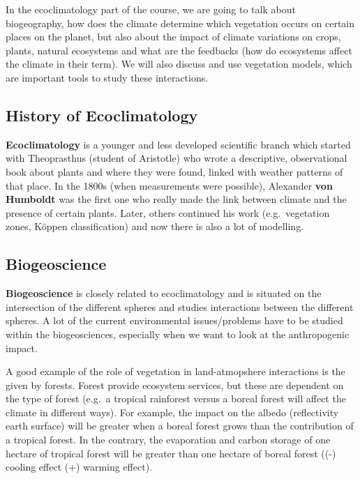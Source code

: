 \documentclass[oneside]{book}
\begin{document}
In the ecoclimatology part of the course, we are going to talk about
biogeography, how does the climate determine which vegetation occurs on
certain places on the planet, but also about the impact of climate
variations on crops, plants, natural ecosystems and what are the
feedbacks (how do ecosystems affect the climate in their term). We will
also discuss and use vegetation models, which are important tools to
study these interactions.

\subsection{History of Ecoclimatology}\label{history-of-ecoclimatology}

\textbf{Ecoclimatology} is a younger and less developed scientific
branch which started with Theoprasthus (student of Aristotle) who wrote
a descriptive, observational book about plants and where they were
found, linked with weather patterns of that place. In the 1800s (when
measurements were possible), Alexander \textbf{von Humboldt} was the
first one who really made the link between climate and the presence of
certain plants. Later, others continued his work (e.g.~vegetation zones,
Köppen classification) and now there is also a lot of modelling.

\subsection{Biogeoscience}\label{biogeoscience}

\textbf{Biogeoscience} is closely related to ecoclimatology and is
situated on the intersection of the different spheres and studies
interactions between the different spheres. A lot of the current
environmental issues/problems have to be studied within the
biogeosciences, especially when we want to look at the anthropogenic
impact.

A good example of the role of vegetation in land-atmopshere interactions
is the given by forests. Forest provide ecosystem services, but these
are dependent on the type of forest (e.g.~a tropical rainforest versus a
boreal forest will affect the climate in different ways). For example,
the impact on the albedo (reflectivity earth surface) will be greater
when a boreal forest grows than the contribution of a tropical forest.
In the contrary, the evaporation and carbon storage of one hectare of
tropical forest will be greater than one hectare of boreal forest ((-)
cooling effect (+) warming effect).
\end{document}
